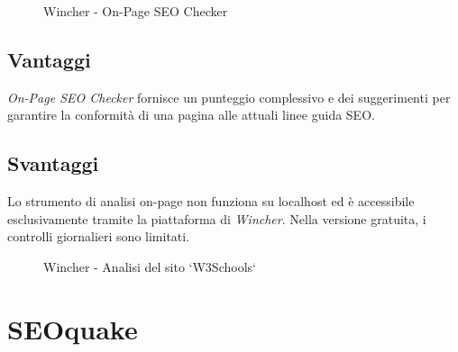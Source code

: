 \begin{figure}[H]
    \centering 
    \caption{Wincher - On-Page SEO Checker}
\end{figure}

\subsection{Vantaggi}
\par \textit{On-Page SEO Checker} fornisce un punteggio complessivo e dei suggerimenti per garantire la conformità di una pagina alle attuali linee guida SEO.

\subsection{Svantaggi}
\par Lo strumento di analisi on-page non funziona su \gls{localhost} ed è accessibile esclusivamente tramite la piattaforma di \textit{Wincher}. Nella versione gratuita, i controlli giornalieri sono limitati.

\begin{figure}[H]
    \centering 
    \caption{Wincher - Analisi del sito `W3Schools`}
\end{figure}

\section{SEOquake}

